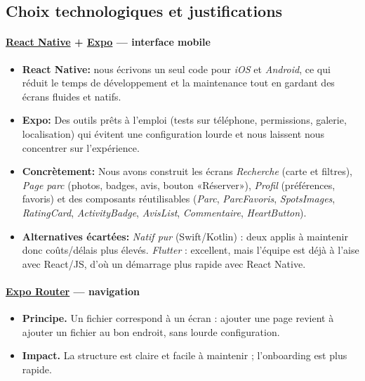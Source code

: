 \documentclass[12pt,a4paper]{article}
\begin{document}
\subsection{Choix technologiques et justifications}

\paragraph{\textbf{\href{https://reactnative.dev}{React Native}} + \textbf{\href{https://expo.dev}{Expo}} — interface mobile}
\begin{itemize}
  \item \textbf{React Native:} nous écrivons un seul code pour \emph{iOS} et \emph{Android}, ce qui réduit le temps de développement et la maintenance tout en gardant des écrans fluides et natifs.
  \item \textbf{Expo:} Des outils prêts à l’emploi (tests sur téléphone, permissions, galerie, localisation) qui évitent une configuration lourde et nous laissent nous concentrer sur l’expérience.
  \item \textbf{Concrètement:} Nous avons construit les écrans \emph{Recherche} (carte et filtres), \emph{Page parc} (photos, badges, avis, bouton «Réserver»), \emph{Profil} (préférences, favoris) et des composants réutilisables (\emph{Parc}, \emph{ParcFavoris}, \emph{SpotsImages}, \emph{RatingCard}, \emph{ActivityBadge}, \emph{AvisList}, \emph{Commentaire}, \emph{HeartButton}).
  \item \textbf{Alternatives écartées:} \emph{Natif pur} (Swift/Kotlin) : deux applis à maintenir donc coûts/délais plus élevés. \emph{Flutter} : excellent, mais l’équipe est déjà à l’aise avec React/JS, d’où un démarrage plus rapide avec React Native.
\end{itemize}

\paragraph{\textbf{\href{https://expo.github.io/router}{Expo Router}} — navigation}
\begin{itemize}
  \item \textbf{Principe.} Un fichier correspond à un écran : ajouter une page revient à ajouter un fichier au bon endroit, sans lourde configuration.
  \item \textbf{Impact.} La structure est claire et facile à maintenir ; l’onboarding est plus rapide.
\end{itemize}
\end{document}
